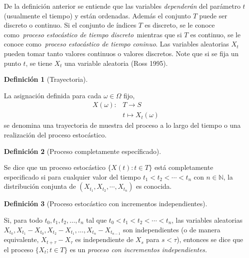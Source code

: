 \documentclass[
  letterpaper,
  DIV=11,
  numbers=noendperiod]{scrreport}
\theoremstyle{plain}
\theoremstyle{definition}
\newtheorem{definition}{Definición}[chapter]
\theoremstyle{definition}
\theoremstyle{plain}
\theoremstyle{remark}
\begin{document}
De la definición anterior se entiende que las variables
\emph{dependerán} del parámetro \(t\) (usualmente el tiempo) y están
ordenadas. Además el conjunto \(T\) puede ser discreto o continuo. Si el
conjunto de índices \(T\) es discreto, se le conoce como~\emph{proceso
estocástico de tiempo discreto}~mientras que si \(T\) es continuo, se le
conoce como~\emph{proceso estocástico de tiempo coninuo}. Las variables
aleatorias \(X_t\) pueden tomar tanto valores continuos o valores
discretos. Note que si se fija un punto \(t\), se tiene \(X_t\) una
variable aleatoria (Ross 1995).

\begin{definition}[Trayectoria]\protect\hypertarget{def-realiza}{}\label{def-realiza}

La asignación definida para cada \(\omega\in\Omega\) fijo,
\[\begin{split}X(\omega): & T\to S\\ &t\mapsto X_t(\omega)\end{split}\]
se denomina una trayectoria de muestra del proceso a lo largo del tiempo
o una realización del proceso estocástico.

\end{definition}

\begin{definition}[Proceso completamente
específicado]\protect\hypertarget{def-pcesp}{}\label{def-pcesp}

Se dice que un proceso estocástico \(\{X(t):t\in T\}\) está
completamente especificado si para cualquier valor del tiempo
\(t_1<t_2<\cdots<t_n\) con \(n\in\mathbb N\), la distribución conjunta
de \((X_{t_1}, X_{t_2},\cdots,X_{t_n})\) es conocida.

\end{definition}

\begin{definition}[Proceso estocástico con incrementos
independientes]\protect\hypertarget{def-incind}{}\label{def-incind}

Si, para todo \(t_0,t_1,t_2,\ldots,t_n\) tal que
\(t_0<t_1<t_2<\cdots<t_n\), las variables aleatorias
\(X_{t_0}, X_{t_1}-X_{t_0}, X_{t_2}-X_{t_1},\ldots,X_{t_n}-X_{t_{n-1}}\)
son independientes (o de manera equivalente, \(X_{t+\tau}-X_\tau\) es
independiente de \(X_s\) para \(s< \tau\)), entonces se dice que el
proceso \(\{X_t; t\in T\}\) es un \emph{proceso con incrementos
independientes.}

\end{definition}
\end{document}
